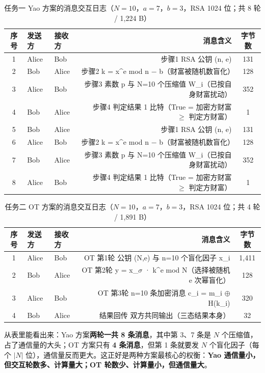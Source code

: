 \documentclass{SYSUReport}
\begin{document}
\begin{table}[h]
\centering
\begin{tabular}{cllrc}
\toprule
序号 & 发送方 & 接收方 & 消息含义 & 字节数 \\
\midrule
1 & Alice & Bob & 步骤1  RSA 公钥 (n, e) & 131 \\
2 & Bob & Alice & 步骤2  k = x\textasciicircum{}e mod n − b（财富被随机数盲化） & 128 \\
3 & Alice & Bob & 步骤3  素数 p 与 N=10 个压缩值 W\_i（已按自身财富扰动） & 352 \\
4 & Bob & Alice & 步骤4  判定结果 1 比特（True = 加密方财富 $\geq$ 判定方财富） & 1 \\
5 & Bob & Alice & 步骤1  RSA 公钥 (n, e) & 131 \\
6 & Alice & Bob & 步骤2  k = x\textasciicircum{}e mod n − b（财富被随机数盲化） & 128 \\
7 & Bob & Alice & 步骤3  素数 p 与 N=10 个压缩值 W\_i（已按自身财富扰动） & 352 \\
8 & Alice & Bob & 步骤4  判定结果 1 比特（True = 加密方财富 $\geq$ 判定方财富） & 1 \\
\bottomrule
\end{tabular}
\caption{任务一 Yao 方案的消息交互日志（$N=10$，$a=7$，$b=3$，RSA 1024 位；共 8 轮 / 1,224 B）}
\label{tab:logyao}
\end{table}

\begin{table}[h]
\centering
\begin{tabular}{cllrc}
\toprule
序号 & 发送方 & 接收方 & 消息含义 & 字节数 \\
\midrule
1 & Alice & Bob & OT 第1轮  公钥 (N,e) 与 n=10 个盲化因子 x\_i & 1,411 \\
2 & Bob & Alice & OT 第2轮  y = x\_$\sigma$ · k\textasciicircum{}e mod N（选择被随机 e 次幂盲化） & 128 \\
3 & Alice & Bob & OT 第3轮  n=10 条加密消息 c\_i = m\_i $\oplus$ H(k\_i) & 320 \\
4 & Bob & Alice & 结果回传  双方共同输出（三态结果本身） & 32 \\
\bottomrule
\end{tabular}
\caption{任务二 OT 方案的消息交互日志（$N=10$，$a=7$，$b=3$，RSA 1024 位；共 4 轮 / 1,891 B）}
\label{tab:logot}
\end{table}

从表里能看出来：Yao 方案\textbf{两轮一共 8 条消息}，其中第 3、7 条是 $N$ 个压缩值，占了通信量的大头；OT 方案只有 \textbf{4 条消息}，但第 1 条就要发 $N$ 个盲化因子（每个 $|N|$ 位），通信量反而更大。这正好是两种方案最核心的权衡：\textbf{Yao 通信量小，但交互轮数多、计算量大；OT 轮数少、计算量小，但通信量大}。
\end{document}
